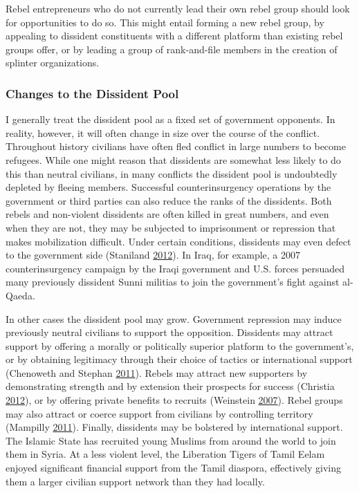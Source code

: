 \documentclass[12pt,]{book}
\theoremstyle{definition}
\theoremstyle{definition}
\theoremstyle{definition}
\theoremstyle{remark}
\begin{document}
Rebel entrepreneurs who do not currently lead their own rebel group
should look for opportunities to do so. This might entail forming a new
rebel group, by appealing to dissident constituents with a different
platform than existing rebel groups offer, or by leading a group of
rank-and-file members in the creation of splinter organizations.

\hypertarget{changes-to-the-dissident-pool}{%
\subsubsection*{Changes to the Dissident
Pool}\label{changes-to-the-dissident-pool}}

I generally treat the dissident pool as a fixed set of government
opponents. In reality, however, it will often change in size over the
course of the conflict. Throughout history civilians have often fled
conflict in large numbers to become refugees. While one might reason
that dissidents are somewhat less likely to do this than neutral
civilians, in many conflicts the dissident pool is undoubtedly depleted
by fleeing members. Successful counterinsurgency operations by the
government or third parties can also reduce the ranks of the dissidents.
Both rebels and non-violent dissidents are often killed in great
numbers, and even when they are not, they may be subjected to
imprisonment or repression that makes mobilization difficult. Under
certain conditions, dissidents may even defect to the government side
(Staniland \protect\hyperlink{ref-Staniland2012d}{2012}). In Iraq, for
example, a 2007 counterinsurgency campaign by the Iraqi government and
U.S. forces persuaded many previously dissident Sunni militias to join
the government's fight against al-Qaeda.

In other cases the dissident pool may grow. Government repression may
induce previously neutral civilians to support the opposition.
Dissidents may attract support by offering a morally or politically
superior platform to the government's, or by obtaining legitimacy
through their choice of tactics or international support (Chenoweth and
Stephan \protect\hyperlink{ref-Chenoweth2011}{2011}). Rebels may attract
new supporters by demonstrating strength and by extension their
prospects for success (Christia
\protect\hyperlink{ref-Christia2012}{2012}), or by offering private
benefits to recruits (Weinstein
\protect\hyperlink{ref-Weinstein2007}{2007}). Rebel groups may also
attract or coerce support from civilians by controlling territory
(Mampilly \protect\hyperlink{ref-Mampilly2011}{2011}). Finally,
dissidents may be bolstered by international support. The Islamic State
has recruited young Muslims from around the world to join them in Syria.
At a less violent level, the Liberation Tigers of Tamil Eelam enjoyed
significant financial support from the Tamil diaspora, effectively
giving them a larger civilian support network than they had locally.
\end{document}
